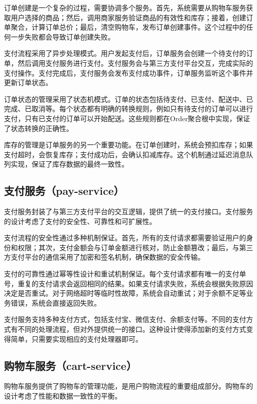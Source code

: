 \documentclass[a4paper,12pt]{article}
\begin{document}
订单创建是一个复杂的过程，需要协调多个服务。首先，系统需要从购物车服务获取用户选择的商品；然后，调用商家服务验证商品的有效性和库存；接着，创建订单聚合，计算订单总价；最后，清空购物车，发布订单创建事件。这个过程中的任何一步失败都会导致订单创建失败。

支付流程采用了异步处理模式。用户发起支付后，订单服务会创建一个待支付的订单，然后调用支付服务进行支付。支付服务会与第三方支付平台交互，完成实际的支付操作。支付完成后，支付服务会发布支付成功事件，订单服务监听这个事件并更新订单状态。

订单状态的管理采用了状态机模式。订单的状态包括待支付、已支付、配送中、已完成、已取消等。每个状态都有明确的转换规则，例如只有待支付的订单可以进行支付，只有已支付的订单可以开始配送。这些规则都在Order聚合根中实现，保证了状态转换的正确性。

库存的管理是订单服务的另一个重要功能。在订单创建时，系统会预扣库存；如果支付超时，会恢复库存；支付成功后，会确认扣减库存。这个机制通过延迟消息队列实现，保证了库存数据的最终一致性。

\subsection{支付服务（pay-service）}

支付服务封装了与第三方支付平台的交互逻辑，提供了统一的支付接口。支付服务的设计考虑了支付的安全性、可靠性和可扩展性。

支付流程的安全性通过多种机制保证。首先，所有的支付请求都需要验证用户的身份和权限；其次，支付金额会与订单金额进行核对，防止金额篡改；最后，与第三方支付平台的通信采用了加密和签名机制，确保数据的安全传输。

支付的可靠性通过幂等性设计和重试机制保证。每个支付请求都有唯一的支付单号，重复的支付请求会返回相同的结果。如果支付请求失败，系统会根据失败原因决定是否重试。对于网络超时等临时性故障，系统会自动重试；对于余额不足等业务错误，系统会直接返回失败。

支付服务支持多种支付方式，包括支付宝、微信支付、余额支付等。不同的支付方式有不同的处理流程，但对外提供统一的接口。这种设计使得添加新的支付方式变得简单，只需要实现相应的支付处理器即可。

\subsection{购物车服务（cart-service）}

购物车服务提供了购物车的管理功能，是用户购物流程的重要组成部分。购物车的设计考虑了性能和数据一致性的平衡。
\end{document}
